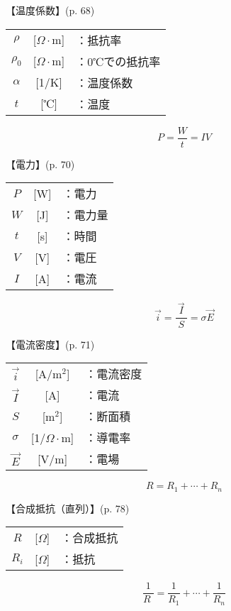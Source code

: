\documentclass[10pt]{jarticle}
\begin{document}
\vskip3mm
\noindent
【温度係数】{\footnotesize (p. 68)}

\begin{tabular}{ccl}
$\rho$	&[$\Omega \cdot $m]	&：抵抗率\\
$\rho_0$	&[$\Omega \cdot $m]	&：0℃での抵抗率\\
$\alpha$	&[1/K]	&：温度係数\\
$t$	&[℃]	&：温度
\end{tabular}





\newpage
\[
P = \frac{W}{t} = I V
\]


\vskip3mm
\noindent
【電力】{\footnotesize (p. 70)}

\begin{tabular}{ccl}
$P$	&[W]	&：電力\\
$W$	& [J]	&：電力量\\
$t$	& [s]	&：時間\\
$V$	& [V]	&：電圧\\
$I$	&[A]	&：電流
\end{tabular}


\newpage
\[
\vec{i} = \frac{\vec{I}}{\; S \;} = \sigma \vec{E}
\]


\vskip3mm
\noindent
【電流密度】{\footnotesize (p. 71)}

\begin{tabular}{ccl}
$\vec{i}$	&[A/m$^2$]	&：電流密度\\
$\vec{I}$	&[A]	&：電流\\
$S$	&[m$^2$]	&：断面積\\
$\sigma$	& [1/$\Omega \cdot$m]	&：導電率\\
$\vec{E}$	& [V/m]	&：電場
\end{tabular}





\newpage
\[
R = R_1 + \cdots + R_n
\]


\vskip3mm
\noindent
【合成抵抗（直列）】{\footnotesize (p. 78)}

\begin{tabular}{ccl}
$R$	&[$\Omega$]	&：合成抵抗 \\
$R_i$	&[$\Omega$]	&：抵抗 \\
\end{tabular}





\newpage
\[
\frac{1}{R \;} = \frac{1}{R_1} + \cdots + \frac{1}{R_n}
\]
\end{document}
